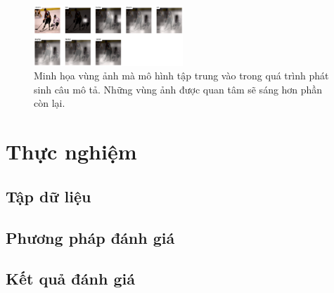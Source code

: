 \documentclass[conference]{IEEEtran}
\begin{document}
\begin{figure}[h]
\includegraphics[width=0.5\textwidth]{assets/attention.png}
  \caption{Minh họa vùng ảnh mà mô hình tập trung vào trong quá trình phát sinh câu mô tả. Những vùng ảnh được quan tâm sẽ sáng hơn phần còn lại.}
  \label{fig:RNN_LSTM_attention}
\end{figure}


\section{Thực nghiệm}
\subsection{Tập dữ liệu}
\subsection{Phương pháp đánh giá}
\subsection{Kết quả đánh giá}

\renewcommand{\refname}{Tài liệu tham khảo}


\end{document}
